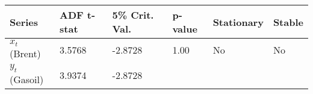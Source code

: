 \documentclass{article}
\begin{document}
    \begin{longtable}[c]{@{}llllll@{}}
\toprule
\begin{minipage}[b]{0.15\columnwidth}\raggedright\strut
Series
\strut\end{minipage} &
\begin{minipage}[b]{0.15\columnwidth}\raggedright\strut
ADF t-stat
\strut\end{minipage} &
\begin{minipage}[b]{0.19\columnwidth}\raggedright\strut
5\% Crit. Val.
\strut\end{minipage} &
\begin{minipage}[b]{0.13\columnwidth}\raggedright\strut
p-value
\strut\end{minipage} &
\begin{minipage}[b]{0.15\columnwidth}\raggedright\strut
Stationary
\strut\end{minipage} &
\begin{minipage}[b]{0.10\columnwidth}\raggedright\strut
Stable
\strut\end{minipage}\tabularnewline
\midrule
\endhead
\begin{minipage}[t]{0.15\columnwidth}\raggedright\strut
\(x_t\) (Brent)
\strut\end{minipage} &
\begin{minipage}[t]{0.15\columnwidth}\raggedright\strut
3.5768
\strut\end{minipage} &
\begin{minipage}[t]{0.19\columnwidth}\raggedright\strut
-2.8728
\strut\end{minipage} &
\begin{minipage}[t]{0.13\columnwidth}\raggedright\strut
1.00
\strut\end{minipage} &
\begin{minipage}[t]{0.15\columnwidth}\raggedright\strut
No
\strut\end{minipage} &
\begin{minipage}[t]{0.10\columnwidth}\raggedright\strut
No
\strut\end{minipage}\tabularnewline
\begin{minipage}[t]{0.15\columnwidth}\raggedright\strut
\(y_t\) (Gasoil)
\strut\end{minipage} &
\begin{minipage}[t]{0.15\columnwidth}\raggedright\strut
3.9374
\strut\end{minipage} &
\begin{minipage}[t]{0.19\columnwidth}\raggedright\strut
-2.8728
\strut\end{minipage} &

\end{longtable}
\end{document}
